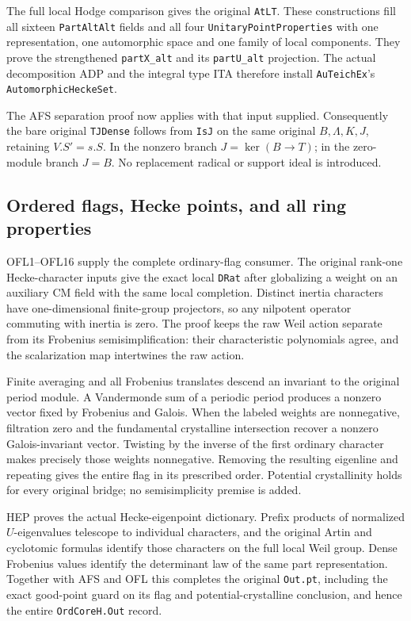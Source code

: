 The full local Hodge comparison gives the original
\texttt{At\allowbreak LT}.  These constructions fill all sixteen
\texttt{Part\allowbreak Alt\allowbreak Alt} fields and all four
\texttt{Unitary\allowbreak Point\allowbreak Properties} with one representation, one
automorphic space and one family of local components.
They prove the strengthened \texttt{part\allowbreak X\_\allowbreak alt} and its
\texttt{part\allowbreak U\_\allowbreak alt} projection.  The actual decomposition ADP
and the integral type ITA therefore install
\texttt{Au\allowbreak Teich\allowbreak Ex}'s \texttt{Automorphic\allowbreak Hecke\allowbreak Set}.

The AFS separation proof now applies with that input supplied.
Consequently the bare original \texttt{TJDense} follows from
\texttt{Is\allowbreak J} on the same original $B,\Lambda,K,J$, retaining
$V.S'=s.S$.  In the nonzero branch $J=\ker(B\to T)$;
in the zero-module branch $J=B$.  No replacement radical or
support ideal is introduced.

\subsection{Ordered flags, Hecke points, and all ring properties}

OFL1--OFL16 supply the complete ordinary-flag consumer.
The original rank-one Hecke-character inputs give the exact local
\texttt{DRat} after globalizing a weight on an auxiliary CM field
with the same local completion.  Distinct inertia characters have
one-dimensional finite-group projectors, so any nilpotent operator
commuting with inertia is zero.  The proof keeps the raw Weil
action separate from its Frobenius semisimplification: their
characteristic polynomials agree, and the scalarization map
intertwines the raw action.

Finite averaging and all Frobenius translates descend an invariant
to the original period module.  A Vandermonde sum of a periodic
period produces a nonzero vector fixed by Frobenius and Galois.
When the labeled weights are nonnegative, filtration zero and
the fundamental crystalline intersection recover a nonzero
Galois-invariant vector.  Twisting by the inverse of the first
ordinary character makes precisely those weights nonnegative.
Removing the resulting eigenline and repeating gives the entire
flag in its prescribed order.  Potential crystallinity holds for
every original bridge; no semisimplicity premise is added.

HEP proves the actual Hecke-eigenpoint dictionary.  Prefix products
of normalized $U$-eigenvalues telescope to individual characters,
and the original Artin and cyclotomic formulas identify those
characters on the full local Weil group.  Dense Frobenius values
identify the determinant law of the same part representation.
Together with AFS and OFL this completes the original
\texttt{Out.\allowbreak pt}, including the exact good-point guard on its
flag and potential-crystalline conclusion, and hence the entire
\texttt{Ord\allowbreak Core\allowbreak H.\allowbreak Out} record.

